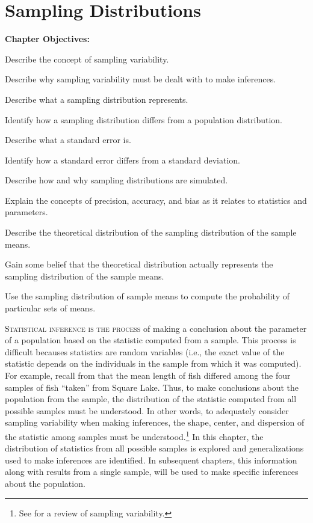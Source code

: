 \documentclass[10pt,openany]{book}\usepackage[]{graphicx}\usepackage[]{color}
\begin{document}
\chapter{Sampling Distributions} \label{chap:SamplingDist}
\begin{ChapObj}{\boxwidth}
  \textbf{Chapter Objectives:}
  \begin{Enumerate}
    \item Describe the concept of sampling variability.
    \item Describe why sampling variability must be dealt with to make inferences.
    \item Describe what a sampling distribution represents.
    \item Identify how a sampling distribution differs from a population distribution.
    \item Describe what a standard error is.
    \item Identify how a standard error differs from a standard deviation.
    \item Describe how and why sampling distributions are simulated.
    \item Explain the concepts of precision, accuracy, and bias as it relates to statistics and parameters.
    \item Describe the theoretical distribution of the sampling distribution of the sample means.
    \item Gain some belief that the theoretical distribution actually represents the sampling distribution of the sample means.
    \item Use the sampling distribution of sample means to compute the probability of particular sets of means.
  \end{Enumerate}
\end{ChapObj}

\minitoc
\newpage

\lettrine{S}{tatistical inference is the process} of making a conclusion about the parameter of a population based on the statistic computed from a sample.  This process is difficult becauses statistics are random variables (i.e., the exact value of the statistic depends on the individuals in the sample from which it was computed).  For example, recall from  that the mean length of fish differed among the four samples of fish ``taken'' from Square Lake.  Thus, to make conclusions about the population from the sample, the distribution of the statistic computed from all possible samples must be understood.  In other words, to adequately consider sampling variability when making inferences, the shape, center, and dispersion of the statistic among samples must be understood.\footnote{See  for a review of sampling variability.}  In this chapter, the distribution of statistics from all possible samples is explored and generalizations used to make inferences are identified.  In subsequent chapters, this information along with results from a single sample, will be used to make specific inferences about the population.
\end{document}
